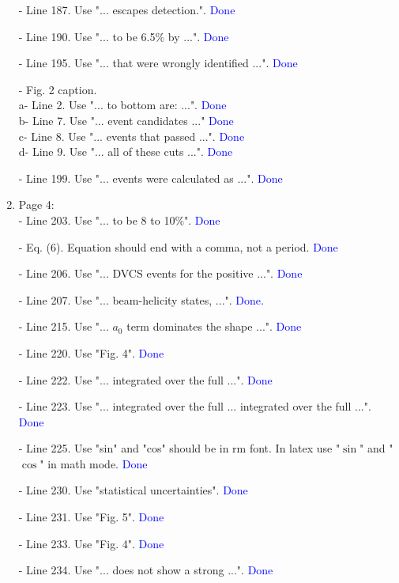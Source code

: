 \documentclass[a4paper,11pt,twoside]{article}
\begin{document}
\begin{enumerate}
- Line 187. Use "... escapes detection.".
     \textcolor{blue}{Done }

- Line 190. Use "... to be 6.5\% by ...".
     \textcolor{blue}{Done }

- Line 195. Use "... that were wrongly identified ...".
     \textcolor{blue}{Done}

- Fig. 2 caption.\\
   a- Line 2. Use "... to bottom are: ...".
    \textcolor{blue}{Done}\\
   b- Line 7. Use "... event candidates ..."
    \textcolor{blue}{Done}\\
   c- Line 8. Use "... events that passed ...".
    \textcolor{blue}{Done}\\
   d- Line 9. Use "... all of these cuts ...".
    \textcolor{blue}{Done}

 - Line 199. Use "... events were calculated as ...".
    \textcolor{blue}{Done}
~\\
\item Page 4:\\
 - Line 203. Use "... to be 8 to 10\%".
     \textcolor{blue}{Done}

- Eq. (6). Equation should end with a comma, not a period.
      \textcolor{blue}{Done}

- Line 206. Use "... DVCS events for the positive ...".
      \textcolor{blue}{Done}

- Line 207. Use "... beam-helicity states, ...".
      \textcolor{blue}{Done.}

- Line 215. Use "... $a_0$ term dominates the shape ...".
      \textcolor{blue}{Done}

- Line 220. Use "Fig. 4".
      \textcolor{blue}{Done}

- Line 222. Use "... integrated over the full ...".
      \textcolor{blue}{Done}

- Line 223. Use "... integrated over the full  ... integrated over the full 
  ...".
      \textcolor{blue}{Done}

- Line 225. Use "sin" and "cos" should be in rm font. In latex use "$\sin$" and 
  "$\cos$" in math mode.
      \textcolor{blue}{Done}

- Line 230. Use "statistical uncertainties".
      \textcolor{blue}{Done}

- Line 231. Use "Fig. 5".
      \textcolor{blue}{Done}

- Line 233. Use "Fig. 4".
      \textcolor{blue}{Done}

- Line 234. Use "... does not show a strong ...".
      \textcolor{blue}{Done}


\end{enumerate}
\end{document}
